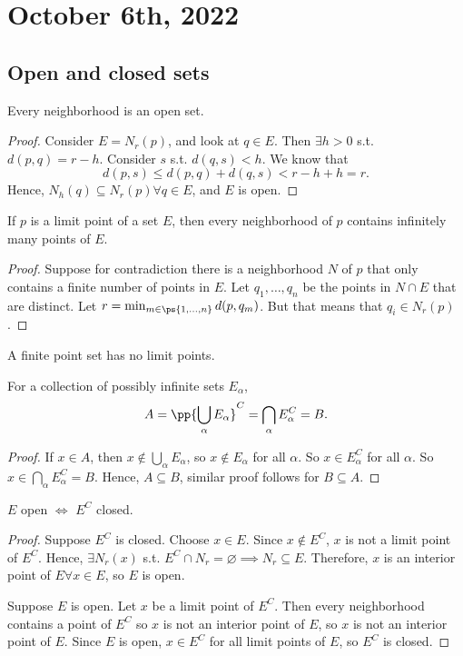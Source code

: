 \documentclass[11pt]{scrartcl}
\numberwithin{equation}{section}
\begin{document}
\clearpage
\section{October 6th, 2022}
\subsection{Open and closed sets}

\begin{theorem}
    \label{thm:nbhdopen}
    Every neighborhood is an open set.
\end{theorem}

\begin{proof}
    Consider $E = N_r(p)$, and look at $q \in E$. Then $\exists h > 0$
    s.t. $d(p,q) = r-h$. Consider $s$ s.t. $d(q,s) < h$.
    We know that 
    \[ d(p,s) \leq d(p,q) + d(q,s) < r-h+h = r.\]
    Hence, $N_h(q) \subseteq N_r(p) \forall q \in E$, and $E$ is open.
\end{proof}
\begin{proposition}
    If $p$ is a limit point of a set $E$, then every neighborhood of $p$
    contains infinitely many points of $E$.
\end{proposition}
\begin{proof}
    Suppose for contradiction there is a neighborhood $N$ of $p$ that 
    only contains a finite number of points in $E$. Let $q_1,\dots,q_n$ 
    be the points in $N\cap E$ that are distinct.
    Let $r = \min_{m\in\ps{1,\dots,n}} d(p,q_m)$. But that means 
    that $q_i \in N_r(p)$.
\end{proof}
\begin{corollary}
    A finite point set has no limit points.
\end{corollary}
\begin{theorem}
    For a collection of possibly infinite sets $E_\alpha$,
    \[ A = \pp{\bigcup_\alpha E_\alpha}^C = \bigcap_\alpha E_\alpha^C = B.\]    
\end{theorem}
\begin{proof}
    If $x\in A$, then $x \notin \bigcup_\alpha E_\alpha$, so $x \notin E_\alpha$ for all $\alpha$. So $x\in E_\alpha^C$ for all $\alpha$.
    So $x \in \bigcap_\alpha E_\alpha^C = B$.
    Hence, $A\subseteq B$, similar proof follows for $B\subseteq A$.
\end{proof}
\begin{theorem}
    $E$ open $\iff$ $E^C$ closed.
\end{theorem}
\begin{proof}
    Suppose $E^C$ is closed. Choose $x \in E$. Since $x\notin E^C$,
    $x$ is not a limit point of $E^C$. Hence, $\exists N_r(x)$ s.t.
    $E^C\cap N_r = \varnothing \implies N_r \subseteq E$. Therefore, $x$ is 
    an interior point of $E\forall x \in E$, so $E$ is open.

    Suppose $E$ is open. Let $x$ be a limit point of $E^C$. Then 
    every neighborhood contains a point of $E^C$ so $x$ is not an interior 
    point of $E$, so $x$ is not an interior point of $E$. Since $E$ 
    is open, $x\in E^C$ for all limit points of $E$, so $E^C$ is closed. 
\end{proof}
\end{document}
